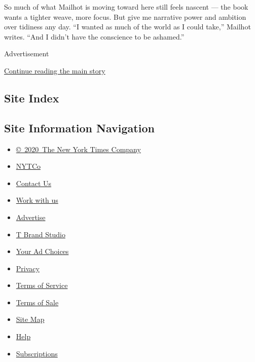 So much of what Mailhot is moving toward here still feels nascent ---
the book wants a tighter weave, more focus. But give me narrative power
and ambition over tidiness any day. ``I wanted as much of the world as I
could take,'' Mailhot writes. ``And I didn't have the conscience to be
ashamed.''

Advertisement

\protect\hyperlink{after-bottom}{Continue reading the main story}

\hypertarget{site-index}{%
\subsection{Site Index}\label{site-index}}

\hypertarget{site-information-navigation}{%
\subsection{Site Information
Navigation}\label{site-information-navigation}}

\begin{itemize}
\tightlist
\item
  \href{https://help.nytimes3xbfgragh.onion/hc/en-us/articles/115014792127-Copyright-notice}{©~2020~The
  New York Times Company}
\end{itemize}

\begin{itemize}
\tightlist
\item
  \href{https://www.nytco.com/}{NYTCo}
\item
  \href{https://help.nytimes3xbfgragh.onion/hc/en-us/articles/115015385887-Contact-Us}{Contact
  Us}
\item
  \href{https://www.nytco.com/careers/}{Work with us}
\item
  \href{https://nytmediakit.com/}{Advertise}
\item
  \href{http://www.tbrandstudio.com/}{T Brand Studio}
\item
  \href{https://www.nytimes3xbfgragh.onion/privacy/cookie-policy\#how-do-i-manage-trackers}{Your
  Ad Choices}
\item
  \href{https://www.nytimes3xbfgragh.onion/privacy}{Privacy}
\item
  \href{https://help.nytimes3xbfgragh.onion/hc/en-us/articles/115014893428-Terms-of-service}{Terms
  of Service}
\item
  \href{https://help.nytimes3xbfgragh.onion/hc/en-us/articles/115014893968-Terms-of-sale}{Terms
  of Sale}
\item
  \href{https://spiderbites.nytimes3xbfgragh.onion}{Site Map}
\item
  \href{https://help.nytimes3xbfgragh.onion/hc/en-us}{Help}
\item
  \href{https://www.nytimes3xbfgragh.onion/subscription?campaignId=37WXW}{Subscriptions}
\end{itemize}
